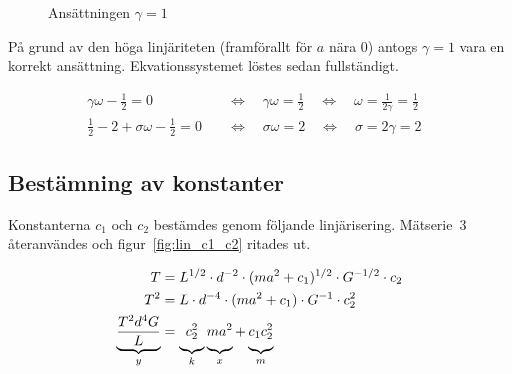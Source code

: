 \documentclass[a4paper,12pt]{article}
\begin{document}
\begin{figure}[h!]
  \caption{Ansättningen $\gamma = 1$}
  \label{fig:lin_c}
\end{figure}

På grund av den höga linjäriteten (framförallt för $a$ nära 0) antogs $\gamma = 1$
vara en korrekt ansättning. Ekvationssystemet löstes sedan fullständigt.

\begin{align}
  \gamma\omega - \frac{1}{2} = 0 \quad &\Leftrightarrow \quad \gamma\omega = \frac{1}{2} \quad \Leftrightarrow \quad \omega = \frac{1}{2\gamma} = \frac{1}{2} & \\[0.5em]
  \frac{1}{2} - 2 + \sigma\omega - \frac{1}{2} = 0 \quad &\Leftrightarrow \quad \sigma\omega = 2 \quad \Leftrightarrow \quad \sigma = 2\gamma = 2 &
\end{align}

\subsection{Bestämning av konstanter}

Konstanterna $c_1$ och $c_2$ bestämdes genom följande linjärisering.
Mätserie~3 återanvändes och figur~\ref{fig:lin_c1_c2} ritades ut.

\begin{align}
  T &= L^{1/2} \cdot d^{-2} \cdot (m a^2 + c_1)^{1/2} \cdot G^{-1/2} \cdot c_2 \nonumber \\
  T^2 &= L \cdot d^{-4} \cdot (m a^2 + c_1) \cdot G^{-1} \cdot c_2^2 \nonumber \\
  \underbrace{\frac{T^2 d^4 G}{L}}_y &= \underbrace{c_2^2 \vphantom{\frac{T^2 d^4 G}{L}}}_k \underbrace{m a^2 \vphantom{\frac{T^2 d^4 G}{L}}}_x + \underbrace{c_1c_2^2 \vphantom{\frac{T^2 d^4 G}{L}}}_m
\end{align}
\end{document}
